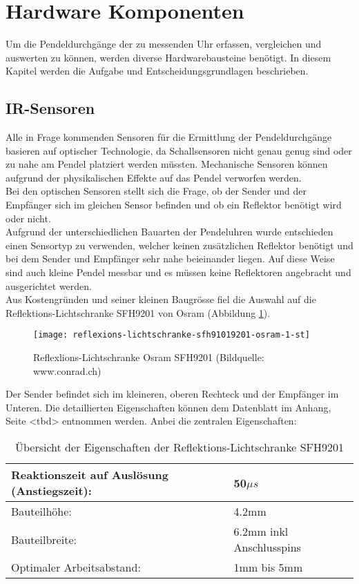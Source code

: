 \section{Hardware Komponenten}
Um die Pendeldurchgänge der zu messenden Uhr erfassen, vergleichen und auswerten zu können, werden diverse Hardwarebausteine benötigt. In diesem Kapitel werden die Aufgabe und Entscheidungsgrundlagen beschrieben.
%
%
\subsection{IR-Sensoren}
\label{cap:sensoren}
	Alle in Frage kommenden Sensoren für die Ermittlung der Pendeldurchgänge basieren auf optischer Technologie, da Schallsensoren nicht genau genug sind oder zu nahe am Pendel platziert werden müssten. Mechanische Sensoren können aufgrund der physikalischen Effekte auf das Pendel verworfen werden.\\
	 Bei den optischen Sensoren stellt sich die Frage, ob der Sender und der Empfänger sich im gleichen Sensor befinden und ob ein Reflektor benötigt wird oder nicht.\\
	Aufgrund der unterschiedlichen Bauarten der Pendeluhren wurde entschieden einen Sensortyp zu verwenden, welcher keinen zusätzlichen Reflektor benötigt und bei dem Sender und Empfänger sehr nahe beieinander liegen. Auf diese Weise sind auch kleine Pendel messbar und es müssen keine Reflektoren angebracht und ausgerichtet werden.\\
	Aus Kostengründen und seiner kleinen Baugrösse fiel die Auswahl auf die Reflektions-Lichtschranke SFH9201 von Osram (Abbildung \ref{fig:SFH9201}).
	\begin{figure}[H]
        \centering
        \texttt{[image: reflexions-lichtschranke-sfh91019201-osram-1-st]}
        \caption{Reflexlions-Lichtschranke Osram SFH9201 (Bildquelle: www.conrad.ch)}
        \label{fig:SFH9201}
    \end{figure}
	\noindent Der Sender befindet sich im kleineren, oberen Rechteck und der Empfänger im Unteren. Die detaillierten Eigenschaften können dem Datenblatt im Anhang, Seite <tbd> entnommen werden. Anbei die zentralen Eigenschaften:
	\begin{table}[H]
		\begin{tabular}{|p{11cm}|p{4cm}|}\hline
			Reaktionszeit auf Auslösung (Anstiegszeit): & 50$\mu{s}$ \\ \hline
			Bauteilhöhe:								& 4.2mm\\ \hline
			Bauteilbreite:								& 6.2mm inkl Anschlusspins\\ \hline
			Optimaler Arbeitsabstand:					& 1mm bis 5mm \\ \hline
		\end{tabular}
		\caption{Übersicht der Eigenschaften der Reflektions-Lichtschranke SFH9201}
		\label{tab:SFH9201}
	\end{table}
%
%	
